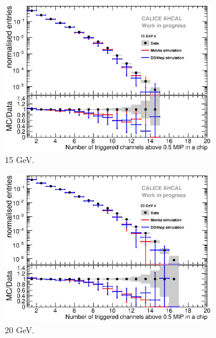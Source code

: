 \begin{figure}[htbp!]
  \begin{subfigure}[t]{0.49\textwidth}
    \centering
    \includegraphics[width=1\textwidth]{../Thesis_Plots/Timing/Electrons/Plots/Comparison_SimData_Electrons_nHits_15GeV.eps}
    \caption{15 GeV.}\label{fig:elec_sim_data_nHits_15GeV}
  \end{subfigure}
  \hfill
  \begin{subfigure}[t]{0.49\textwidth}
    \centering
    \includegraphics[width=1\textwidth]{../Thesis_Plots/Timing/Electrons/Plots/Comparison_SimData_Electrons_nHits_20GeV.eps}
    \caption{20 GeV.}\label{fig:elec_sim_data_nHits_20GeV}
  \end{subfigure}
  \hfill
  \begin{subfigure}[t]{0.49\textwidth}

\end{subfigure}
\end{figure}
